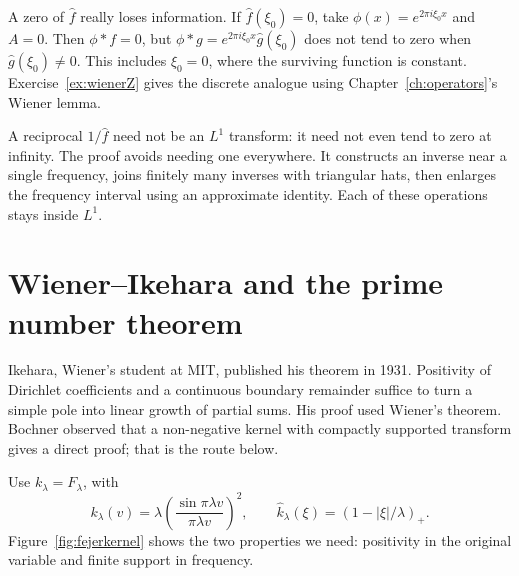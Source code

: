 \begin{remark}
A zero of $\hat f$ really loses information. If $\hat f(\xi_0)=0$, take $\phi(x)=e^{2\pi i\xi_0x}$ and $A=0$. Then $\phi*f=0$, but $\phi*g=e^{2\pi i\xi_0x}\hat g(\xi_0)$ does not tend to zero when $\hat g(\xi_0)\ne0$. This includes $\xi_0=0$, where the surviving function is constant. Exercise~\ref{ex:wienerZ} gives the discrete analogue using Chapter~\ref{ch:operators}'s Wiener lemma.
\end{remark}

\begin{beauty}
A reciprocal $1/\hat f$ need not be an $L^1$ transform: it need not even tend to zero at infinity. The proof avoids needing one everywhere. It constructs an inverse near a single frequency, joins finitely many inverses with triangular hats, then enlarges the frequency interval using an approximate identity. Each of these operations stays inside $L^1$.
\end{beauty}

\section{Wiener--Ikehara and the prime number theorem}

Ikehara, Wiener's student at MIT, published his theorem in 1931. Positivity of Dirichlet coefficients and a continuous boundary remainder suffice to turn a simple pole into linear growth of partial sums. His proof used Wiener's theorem. Bochner observed that a non-negative kernel with compactly supported transform gives a direct proof; that is the route below.

Use $k_\lambda=F_\lambda$, with
\[k_\lambda(v)=\lambda\left(\frac{\sin\pi\lambda v}{\pi\lambda v}\right)^2,\qquad
\hat k_\lambda(\xi)=(1-|\xi|/\lambda)_+.
\]
Figure~\ref{fig:fejerkernel} shows the two properties we need: positivity in the original variable and finite support in frequency.

